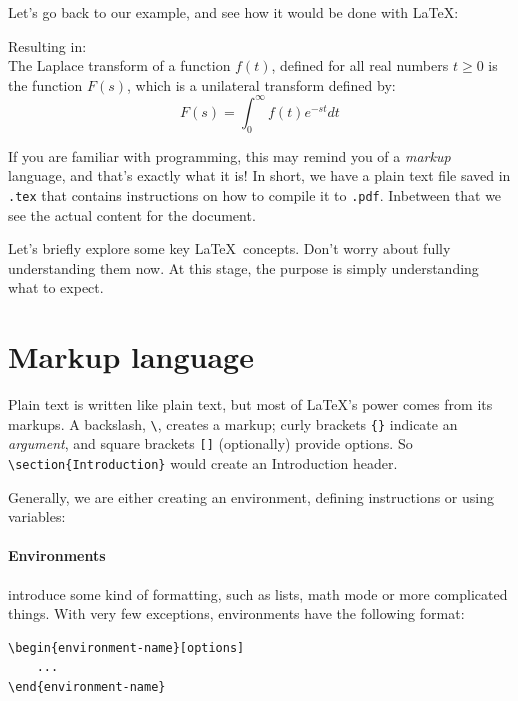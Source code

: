         Let's go back to our example, and see how it would be done with \LaTeX:
        
        Resulting in:\\
        The Laplace transform of a function $f(t)$, defined for all real numbers $t \geq 0$ is the function $F(s)$, which is a unilateral transform defined by:
        \begin{equation*}
            F(s) = \int_0^\infty f(t)e^{-st} dt
        \end{equation*}

        If you are familiar with programming, this may remind you of a \emph{markup} language, and that's exactly what it is!
        In short, we have a plain text file saved in \texttt{.tex} that contains instructions on how to compile it to \texttt{.pdf}.
        Inbetween that we see the actual content for the document.

        Let's briefly explore some key \LaTeX\ concepts.
        Don't worry about fully understanding them now.
        At this stage, the purpose is simply understanding what to expect.

\section{Markup language}
    Plain text is written like plain text, but most of LaTeX's power comes from its markups.
    A backslash, \verb|\|, creates a markup; curly brackets \verb|{}| indicate an \emph{argument}, and square brackets \verb|[]| (optionally) provide options.
    So \verb|\section{Introduction}| would create an Introduction header. 

    Generally, we are either creating an environment, defining instructions or using variables:

    \paragraph{Environments}
    introduce some kind of formatting, such as lists, math mode or more complicated things.
    With very few exceptions, environments have the following format:
        
    \begin{lstlisting}
\begin{environment-name}[options]
    ...
\end{environment-name}
    \end{lstlisting}
        
